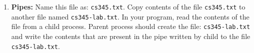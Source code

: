 \documentclass[english]{article}
\begin{document}
	\begin{enumerate}

		\item {\bf Pipes:} Name this file as: {\tt cs345.txt}. Copy
			contents of the file {\tt cs345.txt} to another file
			named {\tt cs345-lab.txt}. In your program, read the
			contents of the file from a child process. Parent
			process should create the file: {\tt cs345-lab.txt} and
			write the contents that are present in the pipe written
			by child to the file {\tt cs345-lab.txt}.

	\end{enumerate}
\end{document}
